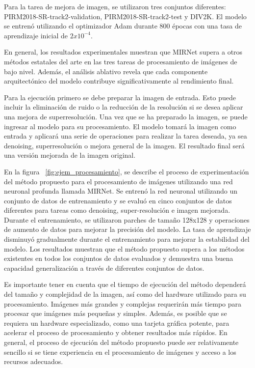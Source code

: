 \documentclass[a4paper,
               ]{jacow}
\begin{document}
Para la tarea de mejora de imagen, se utilizaron tres conjuntos diferentes: PIRM2018-SR-track2-validation, PIRM2018-SR-track2-test y DIV2K. El modelo se entrenó utilizando el optimizador Adam durante 800 épocas con una tasa de aprendizaje inicial de $2x10^{-4}$.

En general, los resultados experimentales muestran que MIRNet supera a otros métodos estatales del arte en las tres tareas de procesamiento de imágenes de bajo nivel. Además, el análisis ablativo revela que cada componente arquitectónico del modelo contribuye significativamente al rendimiento final.

Para la ejecución primero se debe preparar la imagen de entrada. Esto puede incluir la eliminación de ruido o la reducción de la resolución si se desea aplicar una mejora de superresolución. Una vez que se ha preparado la imagen, se puede ingresar al modelo para su procesamiento. El modelo tomará la imagen como entrada y aplicará una serie de operaciones para realizar la tarea deseada, ya sea denoising, superresolución o mejora general de la imagen. El resultado final será una versión mejorada de la imagen original.

En la figura ~\ref{fig:ejem_procesamiento}, se describe el proceso de experimentación del método propuesto para el procesamiento de imágenes utilizando una red neuronal profunda llamada MIRNet. Se entrenó la red neuronal utilizando un conjunto de datos de entrenamiento y se evaluó en cinco conjuntos de datos diferentes para tareas como denoising, super-resolución e imagen mejorada. Durante el entrenamiento, se utilizaron parches de tamaño 128x128 y operaciones de aumento de datos para mejorar la precisión del modelo. La tasa de aprendizaje disminuyó gradualmente durante el entrenamiento para mejorar la estabilidad del modelo. Los resultados muestran que el método propuesto supera a los métodos existentes en todos los conjuntos de datos evaluados y demuestra una buena capacidad generalización a través de diferentes conjuntos de datos.


Es importante tener en cuenta que el tiempo de ejecución del método dependerá del tamaño y complejidad de la imagen, así como del hardware utilizado para su procesamiento. Imágenes más grandes y complejas requerirán más tiempo para procesar que imágenes más pequeñas y simples. Además, es posible que se requiera un hardware especializado, como una tarjeta gráfica potente, para acelerar el proceso de procesamiento y obtener resultados más rápidos. En general, el proceso de ejecución del método propuesto puede ser relativamente sencillo si se tiene experiencia en el procesamiento de imágenes y acceso a los recursos adecuados.
\end{document}
